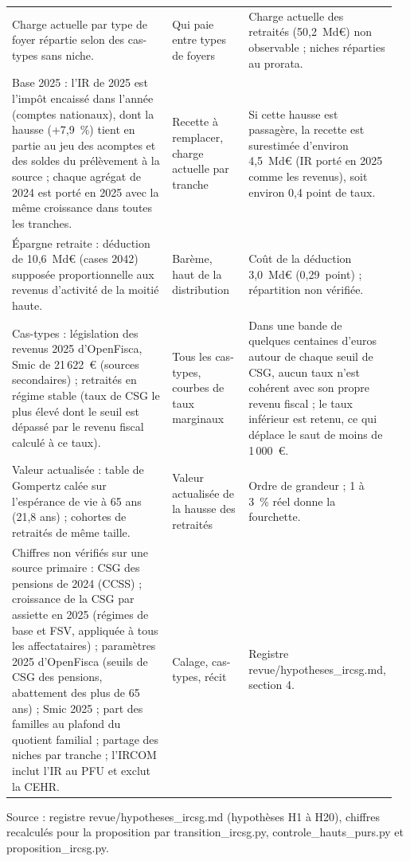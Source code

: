 \begin{table}[!htbp]
\begin{tabular}{@{}p{0.43\linewidth}p{0.2\linewidth}p{0.33\linewidth}@{}}
Charge actuelle par type de foyer répartie selon des cas-types sans niche. & Qui paie entre types de foyers & Charge actuelle des retraités (50,2~Md€) non observable ; niches réparties au prorata. \\[2pt]
Base 2025 : l'IR de 2025 est l'impôt encaissé dans l'année (comptes nationaux), dont la hausse (+7,9~\%) tient en partie au jeu des acomptes et des soldes du prélèvement à la source ; chaque agrégat de 2024 est porté en 2025 avec la même croissance dans toutes les tranches. & Recette à remplacer, charge actuelle par tranche & Si cette hausse est passagère, la recette est surestimée d'environ 4,5~Md€ (IR porté en 2025 comme les revenus), soit environ 0,4 point de taux. \\[2pt]
Épargne retraite : déduction de 10,6~Md€ (cases 2042) supposée proportionnelle aux revenus d'activité de la moitié haute. & Barème, haut de la distribution & Coût de la déduction 3,0~Md€ (0,29~point) ; répartition non vérifiée. \\[2pt]
Cas-types : législation des revenus 2025 d'OpenFisca, Smic de 21\,622~€ (sources secondaires) ; retraités en régime stable (taux de CSG le plus élevé dont le seuil est dépassé par le revenu fiscal calculé à ce taux). & Tous les cas-types, courbes de taux marginaux & Dans une bande de quelques centaines d'euros autour de chaque seuil de CSG, aucun taux n'est cohérent avec son propre revenu fiscal ; le taux inférieur est retenu, ce qui déplace le saut de moins de 1\,000~€. \\[2pt]
Valeur actualisée : table de Gompertz calée sur l'espérance de vie à 65 ans (21,8 ans) ; cohortes de retraités de même taille. & Valeur actualisée de la hausse des retraités & Ordre de grandeur ; 1 à 3~\% réel donne la fourchette. \\[2pt]
Chiffres non vérifiés sur une source primaire : CSG des pensions de 2024 (CCSS) ; croissance de la CSG par assiette en 2025 (régimes de base et FSV, appliquée à tous les affectataires) ; paramètres 2025 d'OpenFisca (seuils de CSG des pensions, abattement des plus de 65 ans) ; Smic 2025 ; part des familles au plafond du quotient familial ; partage des niches par tranche ; l'IRCOM inclut l'IR au PFU et exclut la CEHR. & Calage, cas-types, récit & Registre revue/hypotheses\_ircsg.md, section 4. \\[2pt]
\bottomrule
\end{tabular}
\par\vspace{3pt}\parbox{\linewidth}{\raggedright\scriptsize\color{encre}
Source : registre revue/hypotheses\_ircsg.md (hypothèses H1 à H20), chiffres recalculés pour la proposition par transition\_ircsg.py, controle\_hauts\_purs.py et proposition\_ircsg.py.}
\end{table}
